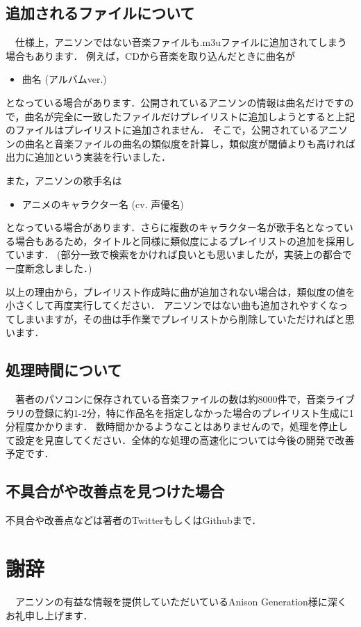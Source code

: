 \documentclass[10pt]{ujarticle}
\begin{document}
\subsection{追加されるファイルについて}
　仕様上，アニソンではない音楽ファイルも.m3uファイルに追加されてしまう場合もあります．
例えば，CDから音楽を取り込んだときに曲名が
\begin{itemize}
    \item 曲名 (アルバムver.)
\end{itemize}
となっている場合があります．公開されているアニソンの情報は曲名だけですので，曲名が完全に一致したファイルだけプレイリストに追加しようとすると上記のファイルはプレイリストに追加されません．
そこで，公開されているアニソンの曲名と音楽ファイルの曲名の類似度を計算し，類似度が閾値よりも高ければ出力に追加という実装を行いました．
\par また，アニソンの歌手名は
\begin{itemize}
    \item アニメのキャラクター名 (cv. 声優名)
\end{itemize}
となっている場合があります．さらに複数のキャラクター名が歌手名となっている場合もあるため，タイトルと同様に類似度によるプレイリストの追加を採用しています．
(部分一致で検索をかければ良いとも思いましたが，実装上の都合で一度断念しました．)
\par 以上の理由から，プレイリスト作成時に曲が追加されない場合は，類似度の値を小さくして再度実行してください．
アニソンではない曲も追加されやすくなってしまいますが，その曲は手作業でプレイリストから削除していただければと思います．

\subsection{処理時間について}
　著者のパソコンに保存されている音楽ファイルの数は約8000件で，音楽ライブラリの登録に約1-2分，特に作品名を指定しなかった場合のプレイリスト生成に1分程度かかります．
数時間かかるようなことはありませんので，処理を停止して設定を見直してください．全体的な処理の高速化については今後の開発で改善予定です．

\subsection{不具合がや改善点を見つけた場合}
不具合や改善点などは著者のTwitterもしくはGithubまで．

\section*{謝辞}
　アニソンの有益な情報を提供していただいているAnison Generation様に深くお礼申し上げます．
\end{document}
